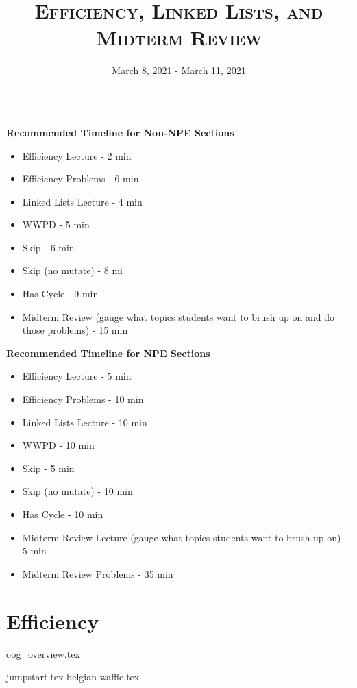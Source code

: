 \documentclass{exam}
\title{\textsc{Efficiency, Linked Lists, and Midterm Review}}
\date{March 8, 2021 - March 11, 2021}
\begin{document}
\maketitle
\rule{\textwidth}{0.15em}
\fontsize{12}{15}\selectfont

\begin{guide}
\textbf{Recommended Timeline for Non-NPE Sections}
\begin{itemize}
    \item Efficiency Lecture - 2 min
    \item Efficiency Problems - 6 min
    \item Linked Lists Lecture - 4 min
    \item WWPD - 5 min
    \item Skip - 6 min
    \item Skip (no mutate) - 8 mi
    \item Has Cycle - 9 min
    \item Midterm Review (gauge what topics students want to brush up on and do those problems) - 15 min
\end{itemize}
\vspace{.5cm}
\textbf{Recommended Timeline for NPE Sections}
\begin{itemize}
    \item Efficiency Lecture - 5 min
    \item Efficiency Problems - 10 min
    \item Linked Lists Lecture - 10 min
    \item WWPD - 10 min
    \item Skip - 5 min
    \item Skip (no mutate) - 10 min
    \item Has Cycle - 10 min
    \item Midterm Review Lecture (gauge what topics students want to brush up on) - 5 min
    \item Midterm Review Problems - 35 min
\end{itemize}
\end{guide}

\section{Efficiency}
{oog_overview.tex}
\begin{questions}
{jumpstart.tex}
{belgian-waffle.tex}
\end{questions}
\end{document}
